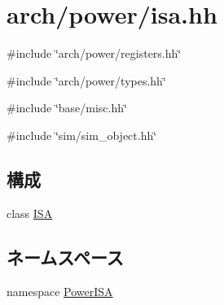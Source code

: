 \hypertarget{power_2isa_8hh}{
\section{arch/power/isa.hh}
\label{power_2isa_8hh}
}
{\ttfamily \#include \char`\"{}arch/power/registers.hh\char`\"{}}\par
{\ttfamily \#include \char`\"{}arch/power/types.hh\char`\"{}}\par
{\ttfamily \#include \char`\"{}base/misc.hh\char`\"{}}\par
{\ttfamily \#include \char`\"{}sim/sim\_\-object.hh\char`\"{}}\par
\subsection*{構成}
\begin{DoxyCompactItemize}
\item 
class \hyperlink{classPowerISA_1_1ISA}{ISA}
\end{DoxyCompactItemize}
\subsection*{ネームスペース}
\begin{DoxyCompactItemize}
\item 
namespace \hyperlink{namespacePowerISA}{PowerISA}
\end{DoxyCompactItemize}
